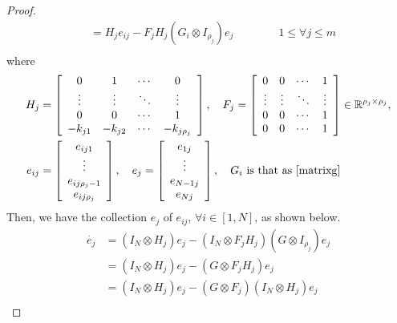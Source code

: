 \documentclass[11pt, a4paper, oneside, openany, reqno]{book}
\theoremstyle{definition}
\theoremstyle{remark}
\numberwithin{equation}{chapter} %
\newcommand{\R}{\ensuremath{{\mathbb R}}}
\begin{document}
\begin{proof}
\begin{equation}
\begin{split}
		&= H_j e_{ij} - F_j H_j (G_i \otimes I_{\rho_j}) e_{j}
		\qquad\qquad 1 \leq \forall j \leq m \\
	\end{split}\end{equation}	
	where
	\begin{equation}\begin{split}	
		H_j &=\left[\begin{array}{cccc}
		0 & 1 & \cdots & 0\\
		\vdots & \vdots & \ddots & \vdots\\
		0 & 0 & \cdots & 1\\
		-k_{j1} & -k_{j2} & \cdots & -k_{j\rho_j}\end{array}\right],
		\quad
		F_j = \left[\begin{array}{cccc}
		0 & 0 & \cdots & 1\\
		\vdots & \vdots & \ddots & \vdots\\
		0 & 0 & \cdots & 1\\
		0 & 0 & \cdots & 1\end{array}\right] \in \R^{\rho_j \times \rho_j}, \\		
		e_{ij} &= \left[ 
		\begin{array}{c } e_{ij1} \\ \vdots \\  e_{ij\rho_j-1} \\ e_{ij\rho_j} \\ \end{array}	 
		\right],
		\quad		
		e_{j} = \left[ 
		\begin{array}{c } e_{1j} \\ \vdots \\  e_{N-1j} \\ e_{Nj} \\ \end{array}	 
		\right],
		\quad
		G_i \text{ is that as \eqref{matrixg} }
	\end{split}\end{equation}		
	Then, we have the collection $ e_{j} $ of $ e_{ij} $,  $ \forall i \in \left[ 1,N \right] $,
	as shown below.	
	\begin{equation}\begin{split}\label{errdynamics}
	\dot{e_j} &= (I_N \otimes H_j) e_j - (I_N \otimes F_j H_j)(G \otimes I_{\rho_j}) e_j \\
	&= (I_N \otimes H_j) e_j  - (G \otimes F_j H_j ) e_j \\
	&= (I_N \otimes H_j) e_j  - (G \otimes F_j )(I_N \otimes H_j ) e_j \\

\end{split}
\end{equation}
\end{proof}
\end{document}
